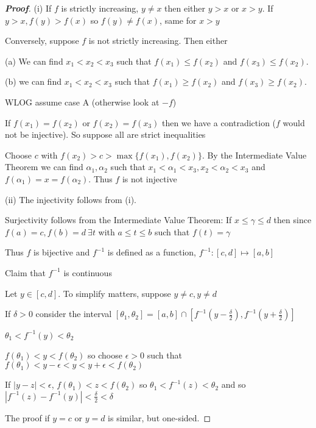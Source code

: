 \begin{proof}[\bf Proof]
\ben
\item [(i)] If $f$ is strictly increasing, $y \neq x$ then either $y > x$ or $x > y$. If $y > x, f(y) > f(x)$ so $f(y) \neq f(x)$, same for $x > y$

Conversely, suppose $f$ is not strictly increasing. Then either
\ben
\item [(a)] We can find $x_1 < x_2 < x_3$ such that $f(x_1) \leq f(x_2)$ and $f(x_3) \leq f(x_2)$.
\item [(b)] we can find $x_1 < x_2 < x_3$ such that $f(x_1) \geq f(x_2)$ and $f(x_3) \geq f(x_2)$.
\een

WLOG assume case A (otherwise look at $-f$)

If $f(x_1) = f(x_2)$ or $f(x_2) = f(x_3)$ then we have a contradiction ($f$ would not be injective). So suppose all are strict inequalities

Choose $c$ with $f(x_2) > c > \max\{f(x_1), f(x_2)\}$. By the Intermediate Value Theorem we can find $\alpha_1, \alpha_2$ such that $x_1 < \alpha_1 < x_3, x_2 < \alpha_2 < x_3$ and $f(\alpha_1) = x = f(\alpha_2)$. Thus $f$ is not injective

\item [(ii)] The injectivity follows from (i). 

Surjectivity follows from the Intermediate Value Theorem: If $x \leq \gamma \leq d$ then since $f(a) = c, f(b) = d \ \exists t$ with $a \leq t \leq b$ such that $f(t) = \gamma$

Thus $f$ is bijective and $f^{-1}$ is defined as a function, $f^{-1} : [c, d] \mapsto [a, b]$

Claim that $f^{-1}$ is continuous

Let $y \in [c, d]$. To simplify matters, suppose $y \neq c, y \neq d$

If $\delta > 0$ consider the interval $[\theta_1, \theta_2] = [a, b] \cap [f^{-1}(y - \frac{\delta}{2}), f^{-1}(y + \frac{\delta}{2})]$

$\theta_1 < f^{-1}(y) < \theta_2$

$f(\theta_1) < y < f(\theta_2)$ so choose $\epsilon > 0$ such that $f(\theta_1) < y - \epsilon < y < y + \epsilon < f(\theta_2)$

If $|y-z| < \epsilon$, $f(\theta_1) < z < f(\theta_2)$ so $\theta_1 < f^{-1}(z) < \theta_2$ and so $|f^{-1}(z) - f^{-1}(y)| < \frac{\delta}{2} < \delta$

The proof if $y = c$ or $y = d$ is similar, but one-sided.
\een
\end{proof}

